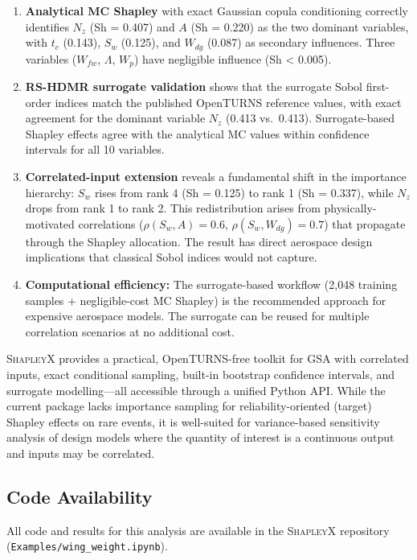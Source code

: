 \documentclass[11pt,a4paper]{article}
\begin{document}
\begin{enumerate}[nosep]
    \item \textbf{Analytical MC Shapley} with exact Gaussian copula conditioning correctly identifies $N_z$ (Sh = 0.407) and $A$ (Sh = 0.220) as the two dominant variables, with $t_c$ (0.143), $S_w$ (0.125), and $W_{dg}$ (0.087) as secondary influences. Three variables ($W_{fw}$, $\Lambda$, $W_p$) have negligible influence (Sh < 0.005).
    \item \textbf{RS-HDMR surrogate validation} shows that the surrogate Sobol first-order indices match the published OpenTURNS reference values, with exact agreement for the dominant variable $N_z$ (0.413 vs.\ 0.413). Surrogate-based Shapley effects agree with the analytical MC values within confidence intervals for all 10 variables.
    \item \textbf{Correlated-input extension} reveals a fundamental shift in the importance hierarchy: $S_w$ rises from rank 4 (Sh = 0.125) to rank 1 (Sh = 0.337), while $N_z$ drops from rank 1 to rank 2. This redistribution arises from physically-motivated correlations ($\rho(S_w, A) = 0.6$, $\rho(S_w, W_{dg}) = 0.7$) that propagate through the Shapley allocation. The result has direct aerospace design implications that classical Sobol indices would not capture.
    \item \textbf{Computational efficiency:} The surrogate-based workflow (2,048 training samples + negligible-cost MC Shapley) is the recommended approach for expensive aerospace models. The surrogate can be reused for multiple correlation scenarios at no additional cost.
\end{enumerate}

\textsc{ShapleyX} provides a practical, OpenTURNS-free toolkit for GSA with correlated inputs, exact conditional sampling, built-in bootstrap confidence intervals, and surrogate modelling---all accessible through a unified Python API. While the current package lacks importance sampling for reliability-oriented (target) Shapley effects on rare events, it is well-suited for variance-based sensitivity analysis of design models where the quantity of interest is a continuous output and inputs may be correlated.

\subsection*{Code Availability}

All code and results for this analysis are available in the \textsc{ShapleyX} repository \cite{ShapleyXRepo} (\texttt{Examples/wing\_weight.ipynb}).
\end{document}

